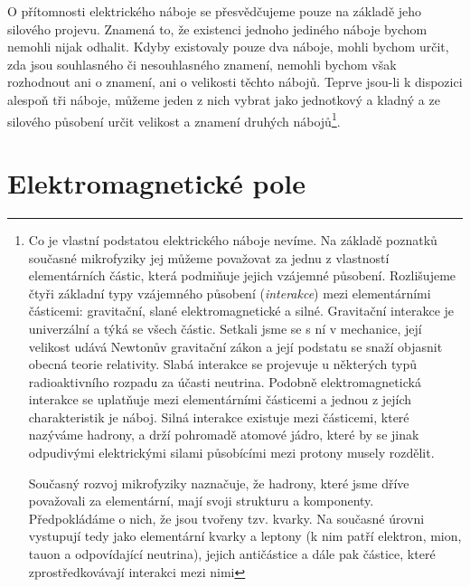       O přítomnosti elektrického náboje se přesvědčujeme pouze na základě jeho silového projevu.
      Znamená to, že existenci jednoho jediného náboje bychom nemohli nijak odhalit. Kdyby
      existovaly pouze dva náboje, mohli bychom určit, zda jsou souhlasného či nesouhlasného
      znamení, nemohli bychom však rozhodnout ani o znamení, ani o velikosti těchto nábojů. Teprve
      jsou-li k dispozici alespoň tři náboje, můžeme jeden z nich vybrat jako jednotkový a kladný a
      ze silového působení určit velikost a znamení druhých nábojů\footnote{Co je vlastní podstatou
      elektrického náboje nevíme. Na základě poznatků současné mikrofyziky jej můžeme považovat za
      jednu z vlastností elementárních částic, která podmiňuje jejich vzájemné působení.
      Rozlišujeme čtyři základní typy vzájemného působení (\emph{interakce}) mezi elementárními
      částicemi: gravitační, slané elektromagnetické a silné. Gravitační interakce je univerzální a
      týká se všech částic. Setkali jsme se s ní v mechanice, její velikost udává Newtonův
      gravitační zákon a její podstatu se snaží objasnit obecná teorie relativity. Slabá interakce
      se projevuje u některých typů radioaktivního rozpadu za účasti neutrina. Podobně
      elektromagnetická interakce se uplatňuje mezi elementárními částicemi a jednou z jejích
      charakteristik je náboj. Silná interakce existuje mezi částicemi, které nazýváme hadrony, a
      drží pohromadě atomové jádro, které by se jinak odpudivými elektrickými silami působícími
      mezi protony musely rozdělit.
      
      Současný rozvoj mikrofyziky naznačuje, že hadrony, které jsme dříve považovali za
      elementární, mají svoji strukturu a komponenty. Předpokládáme o nich, že jsou tvořeny tzv.
      kvarky. Na současné úrovni vystupují tedy jako elementární kvarky a leptony (k nim patří
      elektron, mion, tauon a odpovídající neutrina), jejich antičástice a dále pak částice, které
      zprostředkovávají interakci mezi nimi}.
          
  \section{Elektromagnetické pole}       
